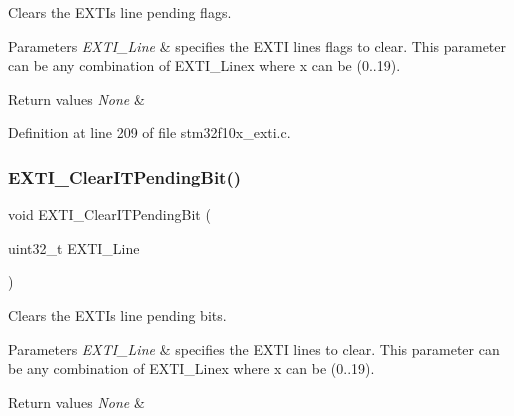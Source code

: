Clears the E\+X\+TI\textquotesingle{}s line pending flags. 


\begin{DoxyParams}{Parameters}
{\em E\+X\+T\+I\+\_\+\+Line} & specifies the E\+X\+TI lines flags to clear. This parameter can be any combination of E\+X\+T\+I\+\_\+\+Linex where x can be (0..19). \\
\hline
\end{DoxyParams}

\begin{DoxyRetVals}{Return values}
{\em None} & \\
\hline
\end{DoxyRetVals}


Definition at line 209 of file stm32f10x\+\_\+exti.\+c.

\mbox{\label{group___e_x_t_i___exported___functions_ga3652a7e682728b310c124e7e974d1468}} 
\subsubsection{\texorpdfstring{E\+X\+T\+I\+\_\+\+Clear\+I\+T\+Pending\+Bit()}{EXTI\_ClearITPendingBit()}}
{\footnotesize\ttfamily void E\+X\+T\+I\+\_\+\+Clear\+I\+T\+Pending\+Bit (\begin{DoxyParamCaption}\item[{uint32\+\_\+t}]{E\+X\+T\+I\+\_\+\+Line }\end{DoxyParamCaption})}



Clears the E\+X\+TI\textquotesingle{}s line pending bits. 


\begin{DoxyParams}{Parameters}
{\em E\+X\+T\+I\+\_\+\+Line} & specifies the E\+X\+TI lines to clear. This parameter can be any combination of E\+X\+T\+I\+\_\+\+Linex where x can be (0..19). \\
\hline
\end{DoxyParams}

\begin{DoxyRetVals}{Return values}
{\em None} & \\
\hline
\end{DoxyRetVals}


